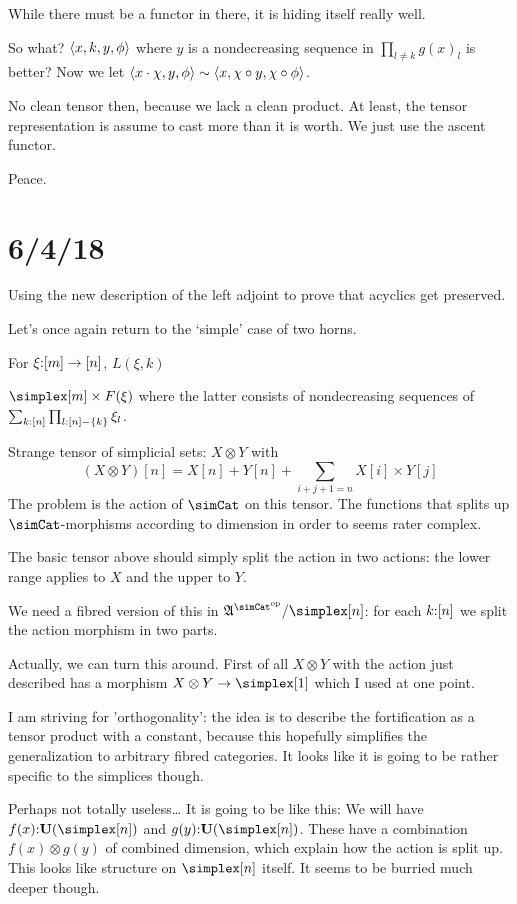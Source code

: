 \documentclass[csh.tex]{subfiles}
\begin{document}
While there must be a functor in there, it is hiding itself really well.

So what? $\left\langle x,k,y,\phi \right\rangle$ where $y$ is a nondecreasing sequence in $\prod_{l\neq k} g(x)_l$ is better? Now we let $\left\langle x\cdot \chi,y,\phi \right\rangle\sim\left\langle x,\chi\circ y,\chi\circ \phi \right\rangle$.

No clean tensor then, because we lack a clean product. At least, the tensor representation is assume to cast more than it is worth. We just use the ascent functor.

Peace.


\section{6/4/18}
Using the new description of the left adjoint to prove that acyclics get preserved.

Let's once again return to the `simple' case of two horns.

For $\xi\mathord : [m]\to[n]$, $L(\xi,k)$

$\simplex[m]\times F(\xi)$ where the latter consists of nondecreasing sequences of $\sum_{k\mathord :[n]}\prod_{l\mathord : [n]-\left\{k\right\}} \xi_l$.


Strange tensor of simplicial sets:
$X\otimes Y$ with \[(X\otimes Y)[n] = X[n]+Y[n]+\sum_{i+j+1=n} X[i]\times Y[j]\]
The problem is the action of $\simCat$ on this tensor. The functions that splits up $\simCat$-morphisms according to dimension in order to 
seems rater complex.

The basic tensor above should simply split the action in two actions:
the lower range applies to $X$ and the upper to $Y$.

We need a fibred version of this in $\ambient\s/\simplex[n]$: for each $k\mathord : [n]$ we split the action morphism in two parts.

Actually, we can turn this around. First of all $X\otimes Y$ with the action just described has a morphism $X\otimes Y \to \simplex[1]$ which I used at one point.

I am striving for 'orthogonality': the idea is to describe the fortification as a tensor product with a constant, because this hopefully simplifies the generalization to arbitrary fibred categories.
It looks like it is going to be rather specific to the simplices though.

Perhaps not totally useless\dots
It is going to be like this:
We will have $f(x)\of \base(\simplex[n])$
and $g(y)\of \base(\simplex[n])$.
These have a combination $f(x) \otimes g(y)$ of combined dimension, which explain how the action is split up.
This looks like structure on $\simplex[n]$ itself. It seems to be burried much deeper though.
\end{document}
